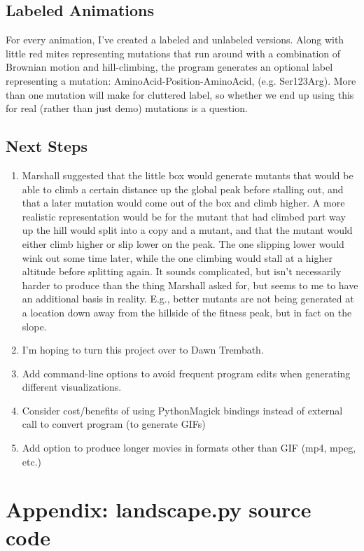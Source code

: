 \documentclass[10pt,letterpaper]{article}
\begin{document}
\subsection*{Labeled Animations}
For every animation, I've created a labeled and unlabeled versions.  Along with little red mites representing mutations that run around with a combination of Brownian motion and hill-climbing, the program generates an optional label representing a mutation: AminoAcid-Position-AminoAcid, (e.g. Ser123Arg).   More than one mutation will make for cluttered label, so whether we end up using this for real (rather than just demo) mutations is a question.

\subsection*{Next Steps}
\begin{enumerate}[itemsep=1pt, topsep=2pt, partopsep=0pt]
\item 
Marshall suggested that the little box would generate mutants that would be able to climb a certain distance up the global peak before stalling out, and that a later mutation would come out of the box and climb higher. A more realistic representation would be for the mutant that had climbed part way up the hill would split into a copy and a mutant, and that the mutant would either climb higher or slip lower on the peak. The one slipping lower would wink out some time later, while the one climbing would stall at a higher altitude before splitting again.  It sounds complicated, but isn't necessarily harder to produce than the thing Marshall asked for, but seems to me to have an additional basis in reality. E.g., better mutants are not being generated at a location down away from the hillside of the fitness peak, but in fact on the slope.
\item I'm hoping to turn this project over to Dawn Trembath.
\item Add command-line options to avoid frequent program edits when generating different visualizations.
\item Consider cost/benefits of using PythonMagick bindings instead of external call to convert program (to generate GIFs)
\item Add option to produce longer movies in formats other than GIF (mp4, mpeg, etc.)
\end{enumerate}


{}

\pagebreak

\section{Appendix: landscape.py source code}
\newcommand*{\SrcPath}{..}

\end{document}
